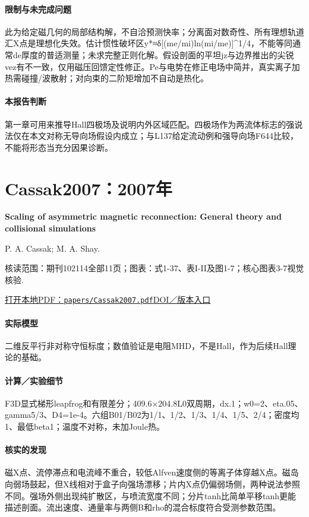 \paragraph{限制与未完成问题}此为给定磁几何的局部结构解，不自洽预测快率；分离面对数奇性、所有理想轨道汇X点是理想化失效。估计惯性破坏区y*≈δ[(me/mi)ln(mi/me)]\textasciicircum{}1/4，不能等同通常de厚度的普适测量；未求完整正则化解。假设剖面的平坦jz与边界推出的尖锐vez有不一致，仅用磁压回馈定性修正。Pe与电势在修正电场中简并，真实离子加热需碰撞/波散射；对向束的二阶矩增加不自动是热化。

\paragraph{本报告判断}第一章可用来推导Hall四极场及说明内外区域匹配。四极场作为两流体标志的强说法仅在本文对称无导向场假设内成立；与L137给定流动例和强导向场F644比较，不能将形态当充分因果诊断。

\section{Cassak2007：2007年}\label{paper:Cassak2007}

\textbf{Scaling of asymmetric magnetic reconnection: General theory and collisional simulations}\citep{Cassak2007}\

P. A. Cassak;  M. A. Shay.

\textsf{核读范围：}期刊102114全部11页；\textsf{图表：}式1-37、表I-II及图1-7；核心图表3-7视觉核验.

\href{run:papers/Cassak2007.pdf}{打开本地PDF：\texttt{papers/Cassak2007.pdf}}\quad\href{https://doi.org/10.1063/1.2795630}{DOI／版本入口}

\paragraph{实际模型}二维反平行非对称守恒标度；数值验证是电阻MHD，不是Hall，作为后续Hall理论的基础。

\paragraph{计算／实验细节}F3D显式梯形leapfrog和有限差分；409.6×204.8L0双周期，dx.1；w0=2、eta.05、gamma5/3、D4=1e-4。六组B01/B02为1/1、1/2、1/3、1/4、1/5、2/4；密度均1、最低beta1；温度不对称，未加Joule热。

\paragraph{核实的发现}磁X点、流停滞点和电流峰不重合，较低Alfven速度侧的等离子体穿越X点。磁岛向弱场鼓起，但X线相对于盒子向强场漂移；片内X点仍偏弱场侧，两种说法参照不同。强场外侧出现纯扩散区，与喷流宽度不同；分片tanh比简单平移tanh更能描述剖面。流出速度、通量率与两侧B和rho的混合标度符合受测参数范围。

